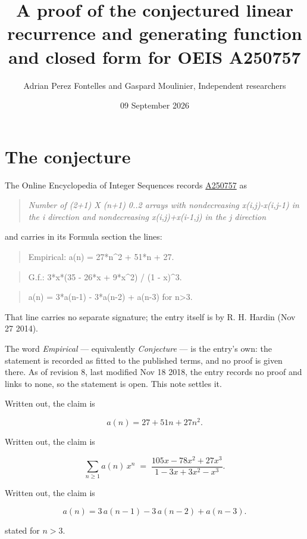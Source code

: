 \documentclass[11pt]{article}
\title{A proof of the conjectured linear recurrence and generating function and closed form for OEIS A250757}
\author{Adrian Perez Fontelles and Gaspard Moulinier, Independent researchers}
\date{09 September 2026}
\theoremstyle{definition}
\begin{document}
\maketitle
\section{The conjecture}

The Online Encyclopedia of Integer Sequences records \href{https://oeis.org/A250757}{A250757} as

\begin{quote}\itshape Number of (2+1) X (n+1) 0..2 arrays with nondecreasing x(i,j)-x(i,j-1) in the i direction and nondecreasing x(i,j)+x(i-1,j) in the j direction\end{quote}

and carries in its Formula section the lines:

\begin{quote}\ttfamily Empirical: a(n) = 27*n\textasciicircum{}2 + 51*n + 27.\end{quote}

\begin{quote}\ttfamily G.f.: 3*x*(35 - 26*x + 9*x\textasciicircum{}2) / (1 - x)\textasciicircum{}3.\end{quote}

\begin{quote}\ttfamily a(n) = 3*a(n-1) - 3*a(n-2) + a(n-3) for n>3.\end{quote}

That line carries no separate signature; the entry itself is by R. H. Hardin (Nov 27 2014).

The word {\itshape Empirical} --- equivalently {\itshape Conjecture} --- is the entry's own: the statement is recorded as fitted to the published terms, and no proof is given there. As of revision 8, last modified Nov 18 2018, the entry records no proof and links to none, so the statement is open. This note settles it.

Written out, the claim is

\[a(n) = 27 + 51n + 27n^{2}.\]

Written out, the claim is

\[\sum_{n \ge 1} a(n)\,x^n \;=\; \frac{105x - 78x^{2} + 27x^{3}}{1 - 3x + 3x^{2} - x^{3}}.\]

Written out, the claim is

\[a(n) = 3\,a(n-1) - 3\,a(n-2) + a(n-3).\]

stated for $n > 3$.
\end{document}
